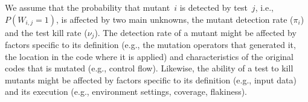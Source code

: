 \documentclass[sigconf,review,anonymous]{acmart}
\begin{document}
We assume that the probability that mutant~$i$ is detected by test~$j$, i.e., $P(W_{i,j}=1)$,
 is affected by two main unknowns, %
%
the mutant detection rate ($\pi_{i}$) and the test kill rate ($\nu_{j}$).
%
The detection rate of a mutant might be affected by
factors specific to its definition (e.g., 
the mutation operators that generated it, the location in the code where it is applied)
and characteristics of the original codes that is mutated (e.g., control flow).
Likewise, the ability of a test to kill mutants might be affected by factors specific to its
definition (e.g., input data) and its execution (e.g., environment settings, coverage,
flakiness).
%
%
%
\end{document}

